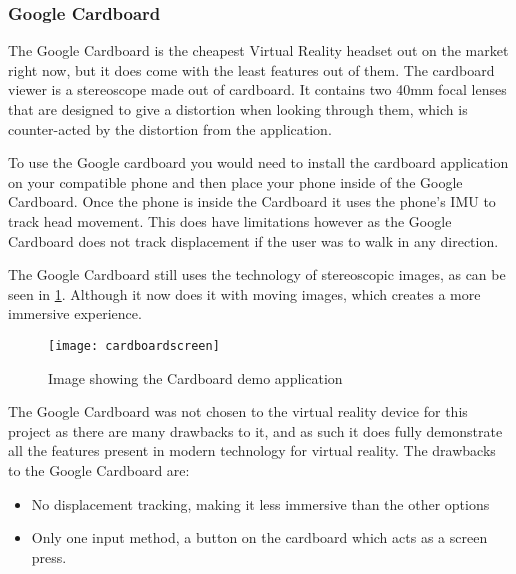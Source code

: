 \subsubsection{Google Cardboard}
The Google Cardboard is the cheapest Virtual Reality headset out on the market right now, but it does come with the least features out of them. The cardboard viewer is a stereoscope made out of cardboard. It contains two 40mm focal lenses that are designed to give a distortion when looking through them, which is counter-acted by the distortion from the application\cite{cardboarddev}.
\newline
\par
To use the Google cardboard you would need to install the cardboard application on your compatible phone and then place your phone inside of the Google Cardboard. Once the phone is inside the Cardboard it uses the phone's IMU to track head movement. This does have limitations however as the Google Cardboard does not track displacement if the user was to walk in any direction.
\newline
\par
The Google Cardboard still uses the technology of stereoscopic images, as can be seen in \ref{fig:cardboard1}. Although it now does it with moving images, which creates a more immersive experience. \\

\begin{figure}[h]
	\texttt{[image: cardboardscreen]}
	\centering
	\caption{Image showing the Cardboard demo application}
	\label{fig:cardboard1}
\end{figure}

The Google Cardboard was not chosen to the virtual reality device for this project as there are many drawbacks to it, and as such it does fully demonstrate all the features present in modern technology for virtual reality. The drawbacks to the Google Cardboard are:

\begin{itemize}
	\item No displacement tracking, making it less immersive than the other options
	\item Only one input method, a button on the cardboard which acts as a screen press.
\end{itemize}

